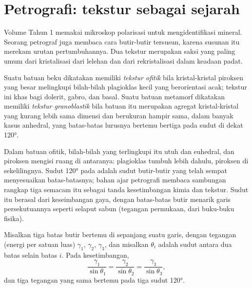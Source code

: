 \section{Petrografi: tekstur sebagai sejarah}\label{sec:b2:field-lab-methods-2:petrography}

Volume Tahun 1 memakai mikroskop polarisasi untuk mengidentifikasi mineral. Seorang petrograf juga membaca
cara butir-butir tersusun, karena susunan itu merekam urutan pertumbuhannya. Dua
tekstur merupakan saksi yang paling umum dari kristalisasi dari lelehan dan dari rekristalisasi dalam
keadaan padat.

\begin{definition}\label{def:b2:field-lab-methods-2:textures}
Suatu batuan beku dikatakan memiliki \emph{tekstur ofitik} bila kristal-kristal piroksen yang besar
melingkupi bilah-bilah plagioklas kecil yang berorientasi acak; tekstur ini khas bagi dolerit, gabro,
dan basal. Suatu batuan metamorf dikatakan memiliki \emph{tekstur granoblastik} bila batuan itu
merupakan agregat kristal-kristal yang kurang lebih sama dimensi dan berukuran hampir sama, dalam banyak kasus anhedral,
yang batas-batas lurusnya bertemu bertiga pada sudut di dekat \ang{120}.
\end{definition}

Dalam batuan ofitik, bilah-bilah yang terlingkupi itu utuh dan euhedral, dan piroksen mengisi ruang
di antaranya: plagioklas tumbuh lebih dahulu, piroksen di sekelilingnya. Sudut \ang{120} pada
 adalah sudut butir-butir yang telah sempat menyesuaikan batas-batasnya; bahan ajar petrografi membaca sambungan
rangkap tiga semacam itu sebagai tanda kesetimbangan kimia dan tekstur. Sudut itu berasal dari keseimbangan gaya, dengan batas-batas butir menarik garis
persekutuannya seperti selaput sabun (tegangan permukaan, dari buku-buku fisika).

\begin{proposition}\label{prop:b2:field-lab-methods-2:triple}
Misalkan tiga batas butir bertemu di sepanjang suatu garis, dengan tegangan (energi per satuan luas) $\gamma_1$,
$\gamma_2$, $\gamma_3$, dan misalkan $\theta_i$ adalah sudut antara dua batas selain
batas $i$. Pada kesetimbangan,
\begin{equation}
\frac{\gamma_1}{\sin\theta_1} = \frac{\gamma_2}{\sin\theta_2} = \frac{\gamma_3}{\sin\theta_3},
\label{eq:b2:field-lab-methods-2:lami}
\end{equation}
dan tiga tegangan yang sama bertemu pada tiga sudut \ang{120}.
\end{proposition}

